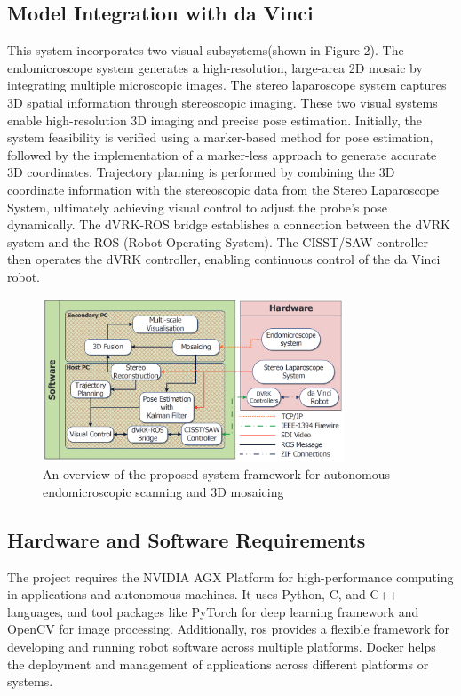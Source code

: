 \documentclass[12pt]{article}
\begin{document}
\subsection{Model Integration with da Vinci}
This system incorporates two visual subsystems(shown in Figure 2)\cite{7989412}. The endomicroscope system generates a high-resolution, large-area 2D mosaic by integrating multiple microscopic images. The stereo laparoscope system captures 3D spatial information through stereoscopic imaging. These two visual systems enable high-resolution 3D imaging and precise pose estimation. Initially, the system feasibility is verified using a marker-based method for pose estimation, followed by the implementation of a marker-less approach to generate accurate 3D coordinates. Trajectory planning is performed by combining the 3D coordinate information with the stereoscopic data from the Stereo Laparoscope System, ultimately achieving visual control to adjust the probe’s pose dynamically. The dVRK-ROS bridge establishes a connection between the dVRK system and the ROS (Robot Operating System). The CISST/SAW controller then operates the dVRK controller, enabling continuous control of the da Vinci robot.

\begin{figure}[H]
            \centering
            \includegraphics[width=0.8\textwidth]{model integration.png}
            \caption{An overview of the proposed system framework for autonomous endomicroscopic scanning and 3D mosaicing\cite{7989412}}
      \end{figure}



\subsection{Hardware and Software Requirements}
The project requires the NVIDIA AGX Platform for high-performance computing in applications and autonomous machines. It uses Python, C, and C++ languages, and tool packages like PyTorch for deep learning framework and OpenCV for image processing. Additionally, \gls{ros} provides a flexible framework for developing and running robot software across multiple platforms. Docker helps the deployment and management of applications across different platforms or systems.
\end{document}
